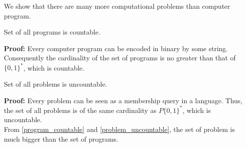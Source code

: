 We show that there are many more computational problems than
computer program.

\begin{claim}
    \label{program_countable}
    Set of all programs is countable.
\end{claim}

\textbf{Proof:} Every computer program can be encoded in binary
by some string. Consequently the cardinality of the set of programs
is no greater than that of ${\{0, 1\}}^{*}$, which is countable.

\begin{claim}
    \label{problem_uncountable}
    Set of all problems is uncountable.
\end{claim}

\textbf{Proof:} Every problem can be seen as a membership query in
a language. Thus, the set of all problems is of the same cardinality
as $P{\{0, 1\}}^{*}$, which is uncountable.\\

From \ref{program_countable} and \ref{problem_uncountable}, 
the set of problem is much bigger than the set of programs.
